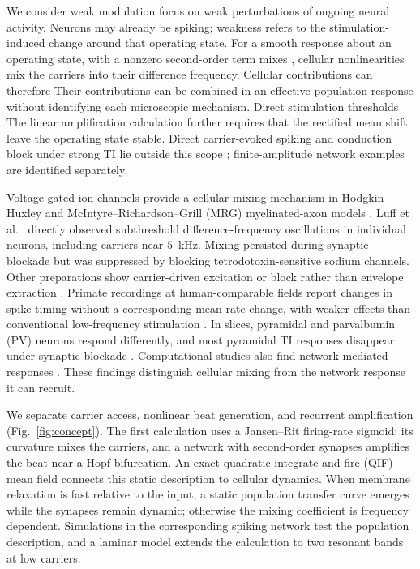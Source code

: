 \documentclass[11pt,a4paper]{article}
\providecommand{\DIFaddtex}[1]{{\protect\color{blue} \sf #1}} %
\providecommand{\DIFdeltex}[1]{{\protect\color{red} \scriptsize #1}} %
\providecommand{\DIFaddbegin}{} %
\providecommand{\DIFaddend}{} %
\providecommand{\DIFdelbegin}{} %
\providecommand{\DIFdelend}{} %
\providecommand{\DIFadd}[1]{\texorpdfstring{\DIFaddtex{#1}}{#1}} %
\providecommand{\DIFdel}[1]{\texorpdfstring{\DIFdeltex{#1}}{}} %
\begin{document}
We \DIFdelbegin \DIFdel{consider weak modulation }\DIFdelend \DIFaddbegin \DIFadd{focus on weak perturbations }\DIFaddend of ongoing neural activity. \DIFaddbegin \DIFadd{Neurons may already be
spiking; weakness refers to the stimulation-induced change around that operating state.
}\DIFaddend For a smooth response \DIFdelbegin \DIFdel{about an operating state, }\DIFdelend \DIFaddbegin \DIFadd{with }\DIFaddend a nonzero second-order term\DIFdelbegin \DIFdel{mixes }\DIFdelend \DIFaddbegin \DIFadd{, cellular nonlinearities mix }\DIFaddend the
carriers into their difference frequency. \DIFdelbegin \DIFdel{Cellular contributions can therefore }\DIFdelend \DIFaddbegin \DIFadd{Their contributions can }\DIFaddend be combined in an
effective population response without identifying each microscopic mechanism. \DIFdelbegin \DIFdel{Direct stimulation thresholds }\DIFdelend \DIFaddbegin \DIFadd{The
linear amplification calculation further requires that the rectified mean shift leave
the operating state stable. Direct carrier-evoked spiking }\DIFaddend and conduction block under
strong TI lie outside this scope\DIFaddbegin \DIFadd{; finite-amplitude network examples are identified
separately}\DIFaddend .

Voltage-gated ion channels provide a cellular mixing mechanism in Hodgkin--Huxley
and McIntyre--Richardson--Grill (MRG) myelinated-axon models \cite{mirzakhalili2020}.
Luff et al.\ \cite{luff2024mixer} directly observed subthreshold difference-frequency
oscillations in individual neurons, including carriers near $5$~kHz. Mixing persisted
during synaptic blockade but was suppressed by blocking tetrodotoxin-sensitive sodium
channels. Other preparations show carrier-driven excitation or block rather than
envelope extraction \cite{opancar2025,peripheral2023,semenov2025}. Primate recordings at
human-comparable fields report changes in spike timing without a corresponding
mean-rate change, with weaker effects than conventional low-frequency stimulation
\cite{vieira2024}. In slices, pyramidal and parvalbumin (PV) neurons respond differently,
and most pyramidal TI responses disappear under synaptic blockade \cite{caldas2024}.
Computational studies also find network-mediated responses
\cite{karimi2024,soroushi2025,wangw2026}. These findings distinguish cellular mixing from
the network response it can recruit.

We separate carrier access, nonlinear beat generation, and recurrent amplification
(Fig.~\ref{fig:concept}). The first calculation uses a Jansen--Rit firing-rate sigmoid:
its curvature mixes the carriers, and a network with second-order synapses amplifies
the beat near a Hopf bifurcation. An exact quadratic integrate-and-fire (QIF) mean
field connects this static description to cellular dynamics. When membrane relaxation
is fast relative to the input, a static population transfer curve emerges while the
synapses remain dynamic; otherwise the mixing coefficient is frequency dependent.
Simulations in the corresponding spiking network test the population description,
and a laminar model extends the calculation to two resonant bands at low carriers.
\end{document}
